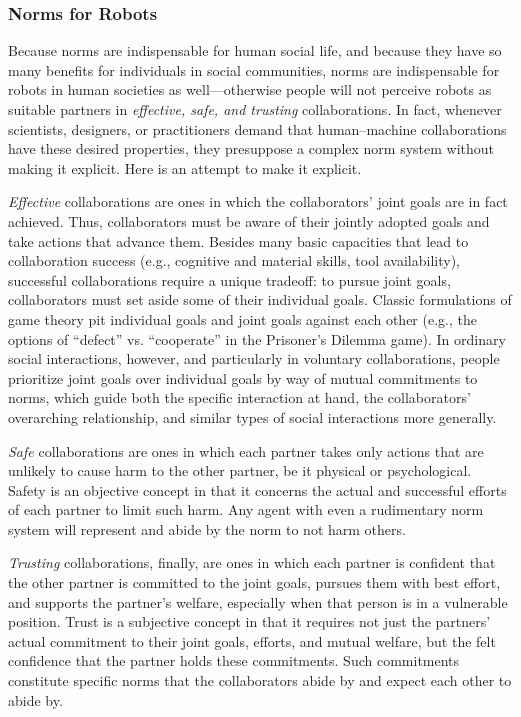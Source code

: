 \documentclass[12pt]{article}
\begin{document}
\subsubsection*{Norms for Robots}

\noindent Because norms are indispensable for human social life, and
because they have so many benefits for individuals in social
communities, norms are indispensable for robots in human societies as
well---otherwise people will not perceive robots as suitable partners in {\em
  effective, safe, and trusting} collaborations.  In fact, whenever
scientists, designers, or practitioners demand that human--machine
collaborations have these desired properties, they presuppose a
complex norm system without making it explicit.  Here is an attempt to
make it explicit.

{\em Effective} collaborations are ones in which the collaborators'
joint goals are in fact achieved.  Thus, collaborators must be aware
of their jointly adopted goals and take actions that advance them.
Besides many basic capacities that lead to collaboration success
(e.g., cognitive and material skills, tool availability), successful
collaborations require a unique tradeoff: to pursue joint goals,
collaborators must set aside some of their individual goals. Classic
formulations of game theory pit individual goals and joint goals
against each other (e.g., the options of ``defect'' vs. ``cooperate'' in the Prisoner's Dilemma game). In ordinary social interactions,
however, and particularly in voluntary collaborations, people
prioritize joint goals over individual goals by way of mutual
commitments to norms, which guide both the specific interaction at
hand, the collaborators' overarching relationship, and similar types
of social interactions more generally.

{\em Safe} collaborations are ones in which each partner takes only
actions that are unlikely to cause harm to the other partner, be it
physical or psychological.  Safety is an objective concept in that it
concerns the actual and successful efforts of each partner to limit
such harm.  Any agent with even a rudimentary norm system will
represent and abide by the norm to not harm others.

{\em Trusting} collaborations, finally, are ones in which each partner is
confident that the other partner is committed to the joint goals,
pursues them with best effort, and supports the partner's welfare,
especially when that person is in a vulnerable position.  Trust
is a subjective concept in that it requires not just the partners'
actual commitment to their joint goals, efforts, and mutual welfare,
but the felt confidence that the partner holds these commitments.
Such commitments constitute specific norms that the collaborators
abide by and expect each other to abide by.
\end{document}
